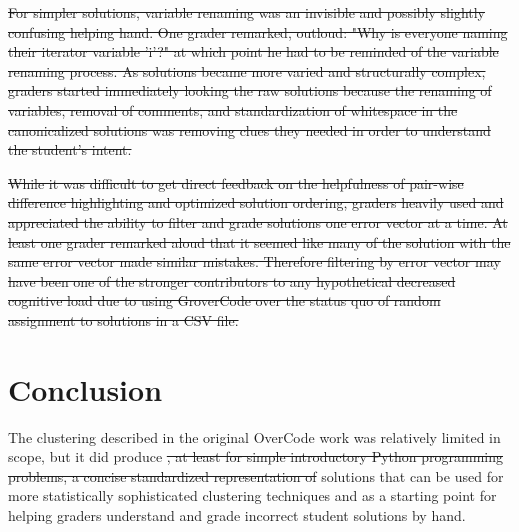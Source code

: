 \documentclass[12pt,twoside]{mitthesis}
\providecommand{\DIFaddtex}[1]{{\protect\color{blue}\uwave{#1}}} %
\providecommand{\DIFdeltex}[1]{{\protect\color{red}\sout{#1}}}                      %
\providecommand{\DIFaddbegin}{} %
\providecommand{\DIFaddend}{} %
\providecommand{\DIFdelbegin}{} %
\providecommand{\DIFdelend}{} %
\providecommand{\DIFadd}[1]{\texorpdfstring{\DIFaddtex{#1}}{#1}} %
\providecommand{\DIFdel}[1]{\texorpdfstring{\DIFdeltex{#1}}{}} %
\begin{document}
\DIFdel{For simpler solutions, variable renaming was an invisible and possibly slightly confusing helping hand. One grader remarked, outloud: "Why is everyone naming their iterator variable 'i'?" at which point he had to be reminded of the variable renaming process. As solutions became more varied and structurally complex, graders started immediately looking the raw solutions because the renaming of variables, removal of comments, and standardization of whitespace in the canonicalized solutions was removing clues they needed in order to understand the student's intent.
}%

\DIFdel{While it was difficult to get direct feedback on the helpfulness of pair-wise difference highlighting and optimized solution ordering, graders heavily used and appreciated the ability to filter and grade solutions one error vector at a time. At least one grader remarked aloud that it seemed like many of the solution with the same error vector made similar mistakes. Therefore filtering by error vector may have been one of the stronger contributors to any hypothetical decreased cognitive load due to using GroverCode over the status quo of random assignment to solutions in a CSV file.
}%

\DIFdelend \section{Conclusion}
The clustering described in the original OverCode work was relatively limited in scope, but it did produce \DIFdelbegin \DIFdel{, at least for simple introductory Python programming problems, a concise standardized representation of }\DIFdelend \DIFaddbegin \DIFadd{platonic }\DIFaddend solutions that can be used for more statistically sophisticated clustering techniques and as a starting point for helping graders understand and grade incorrect student solutions by hand.


%
%


%
%
%
%
\end{document}
